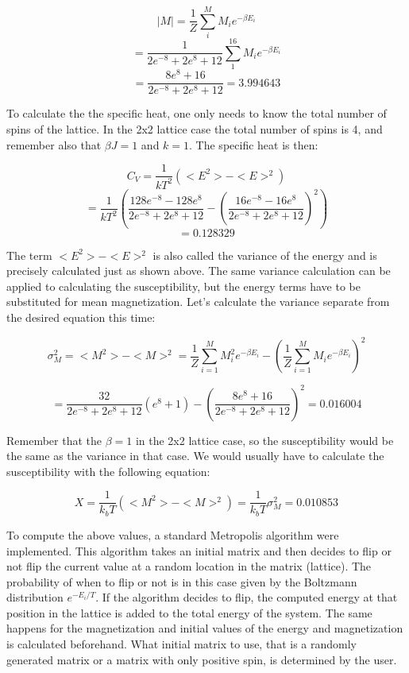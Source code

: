 \documentclass[10pt,a4paper]{article}
\begin{document}
$$
|M| = \frac{1}{Z}\sum^{M}_{i}M_ie^{-\beta E_i}
$$
$$
 = \frac{1}{2e^{-8} + 2e^8 + 12}\sum^{16}_{1}M_ie^{-\beta E_i}
$$
$$
 = \frac{8e^{8} + 16}{2e^{-8} + 2e^8 + 12} = 3.994643
$$



\noindent To calculate the the specific heat, one only needs to know the total number of spins of the lattice. In the 2x2 lattice case the total number of spins is 4, and remember also that $\beta J = 1$ and $k = 1$. The specific heat is then:

$$
C_V = \frac{1}{kT^2}(<E^2> - <E>^2)
$$
$$
 = \frac{1}{kT^2}(\frac{128e^{-8} - 128e^8}{2e^{-8} + 2e^8 + 12} - (\frac{16e^{-8} - 16e^8}{2e^{-8} + 2e^8 + 12})^2)
$$
$$
 = 0.128329
$$

\noindent The term $<E^2> - <E>^2$ is also called the variance of the energy and is precisely calculated just as shown above. The same variance calculation can be applied to calculating the susceptibility, but the energy terms have to be substituted for mean magnetization.
Let's calculate the variance separate from the desired equation this time:

$$
\sigma_M^2 = <M^2>-<M>^2 = \frac{1}{Z}\sum^{M}_{i = 1}M_i^2 e^{-\beta E_i} - (\frac{1}{Z}\sum^{M}_{i = 1}M_i e^{-\beta E_i})^2
$$

$$
 = \frac{32}{2e^{-8} + 2e^8 + 12}(e^{8}+1) - (\frac{8e^8 + 16}{2e^{-8} + 2e^8 + 12})^2 = 0.016004
$$

\noindent Remember that the $\beta = 1$ in the 2x2 lattice case, so the susceptibility would be the same as the variance in that case. We would usually have to calculate the susceptibility with the following equation:

$$
X = \frac{1}{k_bT}(<M^2> - <M>^2) = \frac{1}{k_bT}\sigma_M^2 = 0.010853
$$

\noindent To compute the above values, a standard Metropolis algorithm were implemented. This algorithm takes an initial matrix and then decides to flip or not flip the current value at a random location in the matrix (lattice). The probability of when to flip or not is in this case given by the Boltzmann distribution $e^{-E_i / T}$. If the algorithm decides to flip, the computed energy at that position in the lattice is added to the total energy of the system. The same happens for the magnetization and initial values of the energy and magnetization is calculated beforehand. What initial matrix to use, that is a randomly generated matrix or a matrix with only positive spin, is determined by the user.\\
\end{document}

